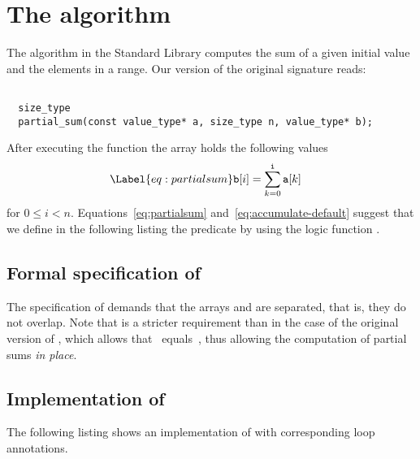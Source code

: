 
\section{The \partialsum algorithm}

The \partialsum algorithm in the \cxx Standard Library \cite[\S 29.8.6]{cxx-17-draft} computes
the sum of a given initial value and the elements in a range.
%
Our version of the original signature
reads:

\begin{lstlisting}[style=acsl-block]

  size_type
  partial_sum(const value_type* a, size_type n, value_type* b);
\end{lstlisting} 

After executing the function \partialsum the array  holds the following values
\begin{align}
\Label{eq:partialsum}
   \mathtt{b}[i] &= \sum_{k = 0}^{\mathtt{i}} \mathtt{a}[k]
\end{align}
for $0 \leq i < n$.
%
Equations~\eqref{eq:partialsum} and~\eqref{eq:accumulate-default}
suggest that we define in the following listing the \acsl predicate \PartialSum
by using the logic function .



\clearpage

\subsection{Formal specification of \partialsum}

The specification of  demands that the arrays
 and  
are separated, that is, they do not overlap.
Note that is a stricter requirement than in the case of the original
\cxx version of \partialsum, which allows that~ equals~,
thus allowing the computation of partial sums \emph{in place}.



\clearpage

\subsection{Implementation of \partialsum}

The following listing shows an implementation of \partialsum with corresponding loop annotations.



\clearpage

